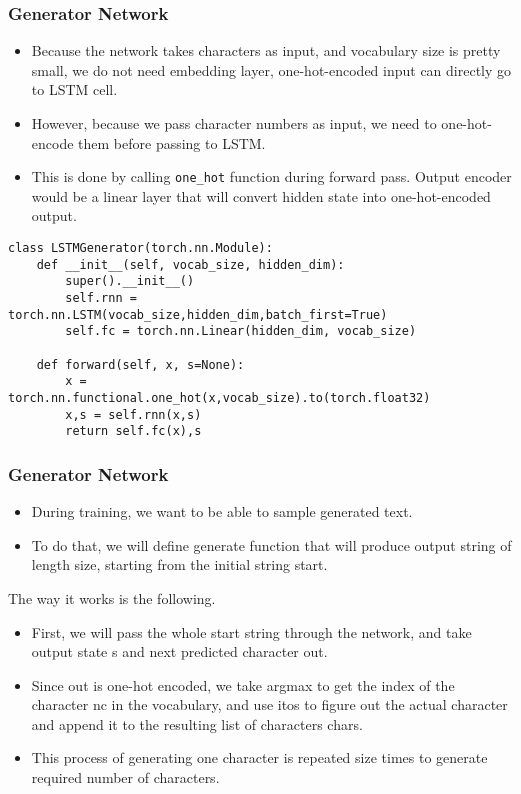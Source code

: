 \begin{frame}[fragile] \frametitle{Generator Network}

\begin{itemize}
\item Because the network takes characters as input, and vocabulary size is pretty small, we do not need embedding layer, one-hot-encoded input can directly go to LSTM cell. 
\item However, because we pass character numbers as input, we need to one-hot-encode them before passing to LSTM. 
\item This is done by calling \lstinline|one_hot| function during forward pass. Output encoder would be a linear layer that will convert hidden state into one-hot-encoded output.
\end{itemize}

\begin{lstlisting}
class LSTMGenerator(torch.nn.Module):
    def __init__(self, vocab_size, hidden_dim):
        super().__init__()
        self.rnn = torch.nn.LSTM(vocab_size,hidden_dim,batch_first=True)
        self.fc = torch.nn.Linear(hidden_dim, vocab_size)

    def forward(self, x, s=None):
        x = torch.nn.functional.one_hot(x,vocab_size).to(torch.float32)
        x,s = self.rnn(x,s)
        return self.fc(x),s
\end{lstlisting}

\end{frame}


\begin{frame}[fragile] \frametitle{Generator Network}

\begin{itemize}
\item During training, we want to be able to sample generated text. 
\item To do that, we will define generate function that will produce output string of length size, starting from the initial string start.
\end{itemize}

The way it works is the following. 

\begin{itemize}
\item First, we will pass the whole start string through the network, and take output state s and next predicted character out. 
\item Since out is one-hot encoded, we take argmax to get the index of the character nc in the vocabulary, and use itos to figure out the actual character and append it to the resulting list of characters chars. 
\item This process of generating one character is repeated size times to generate required number of characters.
\end{itemize}
\end{frame}

